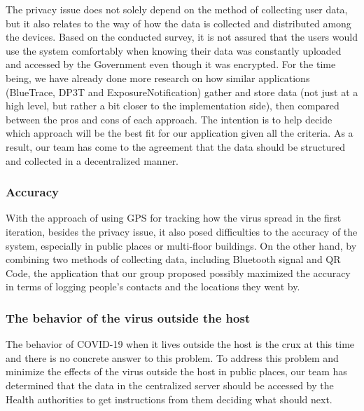 \begin{itemize}
          \par The privacy issue does not solely depend on the method of collecting user data, but it also relates to the way of how the data is collected and distributed among the devices. Based on the conducted survey, it is not assured that the users would use the system comfortably when knowing their data was constantly uploaded and accessed by the Government even though it was encrypted. For the time being,  we have already done more research on how similar applications (BlueTrace, DP3T and ExposureNotification) gather and store data (not just at a high level, but rather a bit closer to the implementation side), then compared between the pros and cons of each approach. The intention is to help decide which approach will be the best fit for our application given all the criteria. As a result, our team has come to the agreement that the data should be structured and collected in a decentralized manner.
      \end{itemize}
    
    \subsubsection{Accuracy}
      \par With the approach of using GPS for tracking how the virus spread in the first iteration, besides the privacy issue, it also posed difficulties to the accuracy of the system, especially in public places or multi-floor buildings. On the other hand, by combining two methods of collecting data, including Bluetooth signal and QR Code, the application that our group proposed possibly maximized the accuracy in terms of logging people's contacts and the locations they went by.
    
    \subsubsection{The behavior of the virus outside the host}
      \par The behavior of COVID-19 when it lives outside the host is the crux at this time and there is no concrete answer to this problem. To address this problem and minimize the effects of the virus outside the host in public places, our team has determined that the data in the centralized server should be accessed by the Health authorities to get instructions from them deciding what should next.
    
